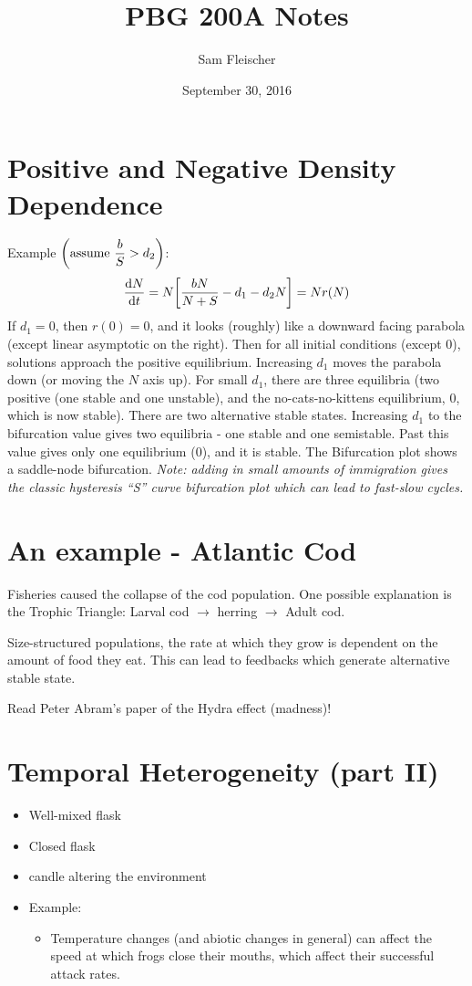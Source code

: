 \documentclass{article}
\title{PBG 200A Notes}
\author{Sam Fleischer}
\date{September 30, 2016}
\begin{document}
    \maketitle

    \section{Positive and Negative Density Dependence}
        Example $\qty(\text{assume } \dfrac{b}{S} > d_2)$:
        \begin{align*}
            \frac{\dd N}{\dd t} = N \qty[\frac{bN}{N + S} - d_1 - d_2 N] = Nr(N)
        \end{align*}
        If $d_1 = 0$, then $r(0) = 0$, and it looks (roughly) like a downward facing parabola (except linear asymptotic on the right).  Then for all initial conditions (except $0$), solutions approach the positive equilibrium.  Increasing $d_1$ moves the parabola down (or moving the $N$ axis up).  For small $d_1$, there are three equilibria (two positive (one stable and one unstable), and the no-cats-no-kittens equilibrium, $0$, which is now stable).  There are two alternative stable states.  Increasing $d_1$ to the bifurcation value gives two equilibria - one stable and one semistable.  Past this value gives only one equilibrium ($0$), and it is stable.  The Bifurcation plot shows a saddle-node bifurcation.  \emph{Note: adding in small amounts of immigration gives the classic hysteresis ``S'' curve bifurcation plot which can lead to fast-slow cycles.}

    \section{An example - Atlantic Cod}
        Fisheries caused the collapse of the cod population.  One possible explanation is the Trophic Triangle: Larval cod $\rightarrow$ herring $\rightarrow$ Adult cod.

        Size-structured populations, the rate at which they grow is dependent on the amount of food they eat.  This can lead to feedbacks which generate alternative stable state.

        Read Peter Abram's paper of the Hydra effect (madness)!

    \section{Temporal Heterogeneity (part II)}
        \begin{itemize}
            \item Well-mixed flask
            \item Closed flask
            \item candle altering the environment
            \item Example:
            \begin{itemize}
                \item Temperature changes (and abiotic changes in general) can affect the speed at which frogs close their mouths, which affect their successful attack rates.
            \end{itemize}
        \end{itemize}
\end{document}
